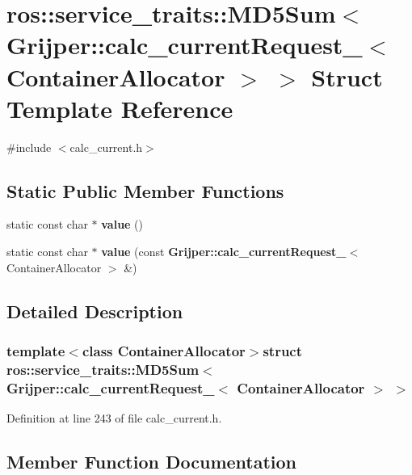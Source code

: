 \section{ros\-:\-:service\-\_\-traits\-:\-:M\-D5\-Sum$<$ Grijper\-:\-:calc\-\_\-current\-Request\-\_\-$<$ Container\-Allocator $>$ $>$ Struct Template Reference}
\label{structros_1_1service__traits_1_1MD5Sum_3_01Grijper_1_1calc__currentRequest___3_01ContainerAllocator_01_4_01_4}


{\ttfamily \#include $<$calc\-\_\-current.\-h$>$}

\subsection*{Static Public Member Functions}
\begin{DoxyCompactItemize}
\item 
static const char $\ast$ {\bf value} ()
\item 
static const char $\ast$ {\bf value} (const {\bf Grijper\-::calc\-\_\-current\-Request\-\_\-}$<$ Container\-Allocator $>$ \&)
\end{DoxyCompactItemize}


\subsection{Detailed Description}
\subsubsection*{template$<$class Container\-Allocator$>$struct ros\-::service\-\_\-traits\-::\-M\-D5\-Sum$<$ Grijper\-::calc\-\_\-current\-Request\-\_\-$<$ Container\-Allocator $>$ $>$}



Definition at line 243 of file calc\-\_\-current.\-h.



\subsection{Member Function Documentation}
